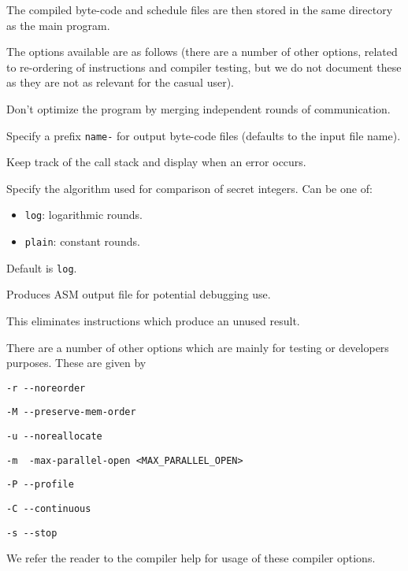 
\noindent The compiled byte-code and schedule files are then stored in the 
same directory as the main program. 


\vspace{5mm}

\noindent
The options available are as follows (there are a number of other options, related to
re-ordering of instructions and compiler testing, but we do not document these as they
are not as relevant for the casual user).

Don't optimize the program by merging independent rounds of communication.

Specify a prefix \verb|name-| for output byte-code files (defaults to the input file name).

Keep track of the call stack and display when an error occurs.

Specify the algorithm used for comparison of secret integers. Can be one of:
\begin{itemize}
\item \verb|log|: logarithmic rounds.
\item \verb|plain|: constant rounds.
\end{itemize}
Default is \verb|log|. 

Produces ASM output file for potential debugging use.

This eliminates instructions which produce an unused result.

\vspace{5mm}
\noindent
There are a number of other options which are mainly for testing
or developers purposes. These are given by
\begin{description}
	\item \verb|-r --noreorder|
	\item \verb|-M --preserve-mem-order|
	\item \verb|-u --noreallocate|
	\item \verb|-m  -max-parallel-open <MAX_PARALLEL_OPEN>|
	\item \verb|-P --profile|
	\item \verb|-C --continuous|
	\item \verb|-s --stop|
\end{description}
We refer the reader to the compiler help for usage of these compiler options.

